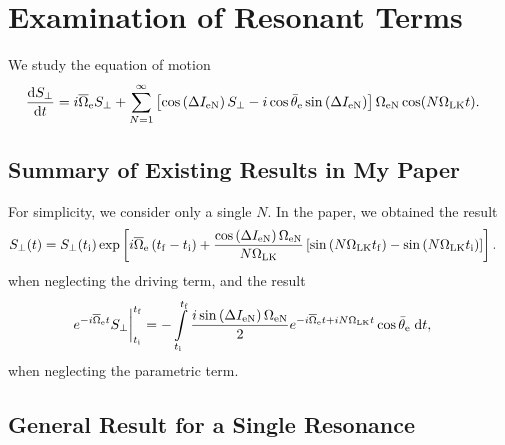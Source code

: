 \documentclass[11pt,
        usenames, %
        dvipsnames %
    ]{article}
\newcommand*{\rd}[2]{\frac{\mathrm{d}#1}{\mathrm{d}#2}}
\newcommand*{\p}[1]{\left(#1\right)}
\newcommand*{\s}[1]{\left[#1\right]}
\begin{document}
\def\Snospace~{\S{}} %
\renewcommand*{\sectionautorefname}{\Snospace}
\renewcommand*{\appendixautorefname}{\Snospace}
\renewcommand*{\figureautorefname}{Fig.}
\renewcommand*{\equationautorefname}{Eq.}
\renewcommand*{\tableautorefname}{Tab.}

\onehalfspacing

\pagestyle{fancy}
\rhead{\today}
\cfoot{\thepage/\pageref{LastPage}}

\section{Examination of Resonant Terms}

We study the equation of motion
\begin{align}
    \rd{S_{\perp}}{t} ={}& i\overline{\Omega}_{\rm e}S_\perp
        + \sum\limits_{N = 1}^\infty\s{
            \cos \p{\Delta I_{\rm eN}}S_\perp
        - i\cos \bar{\theta}_{\rm e} \sin \p{\Delta I_{\rm eN}}}
            \Omega_{\rm eN}\cos (N\Omega_{\rm LK} t).\label{eq:full}
\end{align}

\subsection{Summary of Existing Results in My Paper}

For simplicity, we consider only a single $N$. In the paper, we obtained the
result
\begin{align}
    S_\perp(t) &= S_\perp(t_{\rm i})
        \exp\s{i\overline{\Omega}_{\rm e}\p{t_{\rm f} - t_{\rm i}}
            + \frac{\cos\p{\Delta I_{\rm eN}}
            \Omega_{\rm eN}}{N\Omega_{\rm LK}}\s{\sin\p{N\Omega_{\rm LK}
            t_{\rm f}} - \sin \p{N\Omega_{\rm LK} t_{\rm i}}}}.
            \label{eq:paper_parametric}
\end{align}
when neglecting the driving term, and the result
\begin{align}
    e^{-i\overline{\Omega}_{\rm e}t}S_{\perp}\bigg|_{t_{\rm i}}^{t_{\rm f}}
        &= -\int\limits_{t_{\rm i}}^{t_{\rm f}}
            \frac{i\sin\p{\Delta I_{\rm eN}} \Omega_{\rm eN}}{2}
                e^{-i\overline{\Omega}_{\rm e}t + iN\Omega_{\rm LK} t} \cos
                \bar{\theta}_{\rm e}
            \;\mathrm{d}t,\label{eq:paper_driving}
\end{align}
when neglecting the parametric term.

\subsection{General Result for a Single Resonance}
\end{document}
